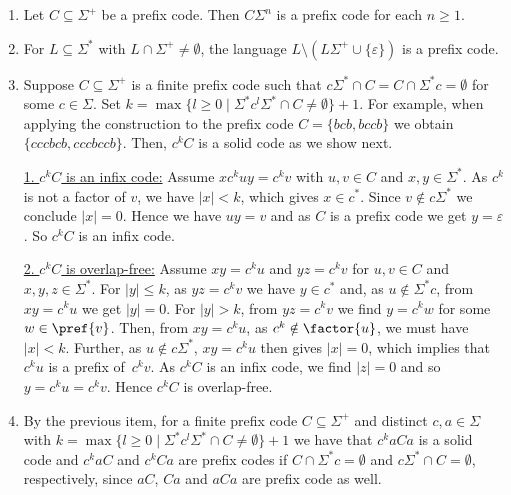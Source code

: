 \begin{example}
\begin{enumerate}
		\item Let $C \subseteq \Sigma^+$ be a prefix code. Then $C\Sigma^n$ is a prefix code for each $n \ge 1$.
			
		\item For $L \subseteq \Sigma^*$ with $L \cap \Sigma^+ \ne \emptyset$,
		the language $L \setminus ( L\Sigma^+ \cup \{\varepsilon\} )$ is a prefix code.
		
		\item \label{constrsync:ex:constr-solid-code} Suppose $C \subseteq \Sigma^+$ is a finite prefix code
		such that $c\Sigma^* \cap C = C \cap \Sigma^*c = \emptyset$
		for some $c \in \Sigma$.
		Set $k = \max\{ l \ge 0 \mid \Sigma^* c^l \Sigma^* \cap C \ne \emptyset \} + 1$.
		For example, when applying the construction to the prefix code $C = \{bcb, bccb\}$
		we obtain $\{cccbcb, cccbccb\}$.
		Then, $c^k C$ is a solid code  as we show next.
		
		\underline{1. $c^kC$ is an infix code:} Assume $xc^kuy = c^kv$ with $u,v \in C$ and $x,y \in \Sigma^*$.
		As $c^k$ is not a factor of $v$, 
		we have $|x| < k$, which gives $x \in c^*$.
		Since $v \notin c\Sigma^*$
		we conclude $|x| = 0$.
		Hence we have $uy = v$ and as $C$ is a prefix code we get $y = \varepsilon$.
		So $c^kC$ is an infix code. 
		
		
		\underline{2. $c^kC$ is overlap-free:} Assume $xy = c^ku$ and $yz = c^kv$
		for $u,v \in C$ and $x,y,z \in \Sigma^*$.
		For $|y| \le k$, as $yz = c^kv$ we have $y \in c^*$
		and, as $u \notin \Sigma^*c$, from $xy = c^ku$ we get $|y| = 0$.
		For $|y| > k$, from $yz = c^kv$ we find $y = c^kw$ for some $w \in \pref{v}$.
		Then, from $xy = c^ku$, as $c^k \notin \factor{u}$, we must have $|x| < k$.
		Further, as $u \notin c\Sigma^*$, $xy = c^ku$ then gives $|x| = 0$, which 
		implies that $c^ku$ is a prefix of~$c^kv$.
		As $c^kC$ is an infix code, we find $|z| = 0$ and so $y = c^ku = c^kv$.
		Hence $c^kC$ is overlap-free.
		
		\item By the previous item, for a finite prefix code $C \subseteq \Sigma^+$
		and distinct $c,a \in \Sigma$ with 
		$k = \max\{ l \ge 0 \mid \Sigma^* c^l \Sigma^* \cap C \ne \emptyset \} + 1$
		we have that $c^k a C a$ is a solid code
		and $c^k aC$ and $c^k Ca$ are prefix codes
		if $C \cap \Sigma^*c = \emptyset$ and $c \Sigma^* \cap C = \emptyset$, respectively,
		since $aC$, $Ca$ and $aCa$ are prefix code as well. 
		
	\end{enumerate}
\end{example} 

